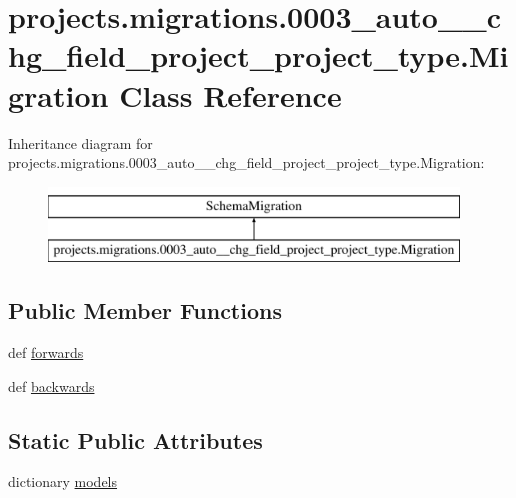 \hypertarget{classprojects_1_1migrations_1_10003__auto____chg__field__project__project__type_1_1_migration}{\section{projects.\-migrations.0003\-\_\-auto\-\_\-\-\_\-chg\-\_\-field\-\_\-project\-\_\-project\-\_\-type.Migration Class Reference}
\label{classprojects_1_1migrations_1_10003__auto____chg__field__project__project__type_1_1_migration}
}
Inheritance diagram for projects.\-migrations.0003\-\_\-auto\-\_\-\-\_\-chg\-\_\-field\-\_\-project\-\_\-project\-\_\-type.Migration\-:\begin{figure}[H]
\begin{center}
\leavevmode
\includegraphics[height=2.000000cm]{classprojects_1_1migrations_1_10003__auto____chg__field__project__project__type_1_1_migration}
\end{center}
\end{figure}
\subsection*{Public Member Functions}
\begin{DoxyCompactItemize}
\item 
def \hyperlink{classprojects_1_1migrations_1_10003__auto____chg__field__project__project__type_1_1_migration_a86d495079f939581b7f48919998d02cb}{forwards}
\item 
def \hyperlink{classprojects_1_1migrations_1_10003__auto____chg__field__project__project__type_1_1_migration_aad7b2c758b7af8a76303d009628a940e}{backwards}
\end{DoxyCompactItemize}
\subsection*{Static Public Attributes}
\begin{DoxyCompactItemize}
\item 
dictionary \hyperlink{classprojects_1_1migrations_1_10003__auto____chg__field__project__project__type_1_1_migration_a8c9f040a0cdcfd721e5fd5d43bb759a1}{models}
\end{DoxyCompactItemize}


